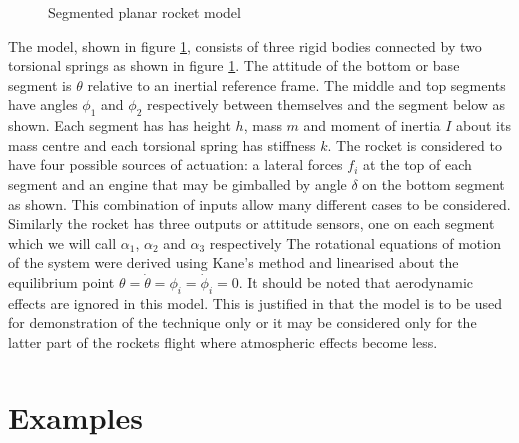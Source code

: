 \documentclass{mbd_fullpaper}
\begin{document}
\begin{figure}[h]
  \begin{center}
    
    \caption{Segmented planar rocket model \label{fig:rocket-model}}
  \end{center}
\end{figure}
The model, shown in figure \ref{fig:rocket-model}, consists of three rigid bodies connected by two torsional springs as shown in figure \ref{fig:rocket-model}.
The attitude of the bottom or base segment is $\theta$ relative to an inertial reference frame.
The middle and top segments have angles $\phi_1$ and $\phi_2$ respectively between themselves and the segment below as shown.
Each segment has has height $h$, mass $m$ and moment of inertia $I$ about its mass centre and each torsional spring has stiffness $k$.
The rocket is considered to have four possible sources of actuation: a lateral forces $f_i$ at the top of each segment and an engine that may be gimballed by angle $\delta$ on the bottom segment as shown.
This combination of inputs allow many different cases to be considered.
Similarly the rocket has three outputs or attitude sensors, one on each segment which we will call $\alpha_1$, $\alpha_2$ and $\alpha_3$ respectively
The rotational equations of motion of the system were derived using Kane's method \cite{Kane1980} and linearised about the equilibrium point $\theta=\dot{\theta}=\phi_i=\dot{\phi}_i=0$.
It should be noted that aerodynamic effects are ignored in this model.
This is justified in that the model is to be used for demonstration of the technique only or it may be considered only for the latter part of the rockets flight where atmospheric effects become less.
\begin{multline}

\end{multline}
\begin{equation}

\end{equation}

\section{Examples}
\label{sec:num-examples}
\end{document}
